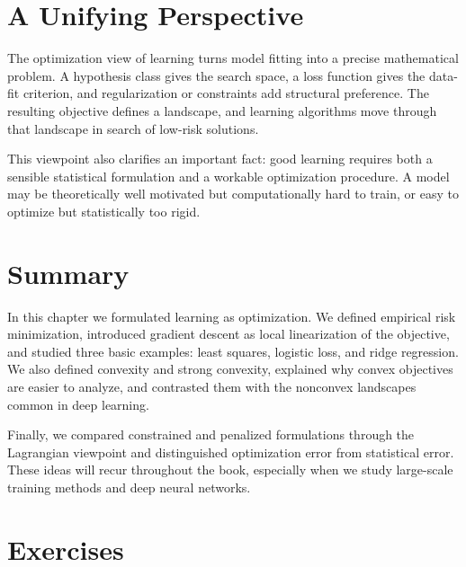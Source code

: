 \section{A Unifying Perspective}

The optimization view of learning turns model fitting into a precise mathematical problem. A hypothesis class gives the search space, a loss function gives the data-fit criterion, and regularization or constraints add structural preference. The resulting objective defines a landscape, and learning algorithms move through that landscape in search of low-risk solutions.

This viewpoint also clarifies an important fact: good learning requires both a sensible statistical formulation and a workable optimization procedure. A model may be theoretically well motivated but computationally hard to train, or easy to optimize but statistically too rigid.

\section{Summary}

In this chapter we formulated learning as optimization. We defined empirical risk minimization, introduced gradient descent as local linearization of the objective, and studied three basic examples: least squares, logistic loss, and ridge regression. We also defined convexity and strong convexity, explained why convex objectives are easier to analyze, and contrasted them with the nonconvex landscapes common in deep learning.

Finally, we compared constrained and penalized formulations through the Lagrangian viewpoint and distinguished optimization error from statistical error. These ideas will recur throughout the book, especially when we study large-scale training methods and deep neural networks.

\section{Exercises}

